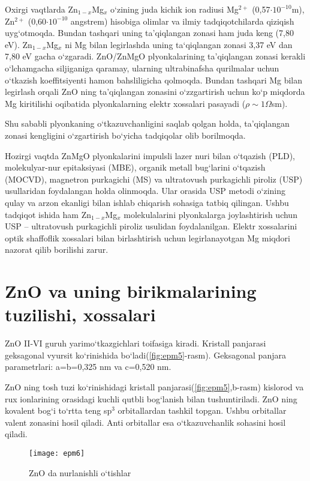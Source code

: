 \documentclass[14pt]{scrarticle}
\begin{document}
	Oxirgi vaqtlarda  Zn$_{1-x}$Mg$_{x}$ o`zining juda kichik ion radiusi Mg$^{2+}$ (0,57$\cdot 10^{-10}$m), Zn$^{2+}$ (0,60$\cdot 10^{-10}$ angstrem) hisobiga olimlar va ilmiy tadqiqotchilarda qiziqish uyg`otmoqda. Bundan tashqari uning ta'qiqlangan zonasi ham juda keng (7,80 eV). Zn$_{1-x}$Mg$_{x}$ ni  Mg bilan legirlashda uning ta`qiqlangan zonasi 3,37 eV dan 7,80 eV gacha o`zgaradi. ZnO/ZnMgO plyonkalarining ta'qiqlangan zonasi kerakli o`lchamgacha siljiganiga qaramay, ularning ultrabinafsha qurilmalar uchun o`tkazish koeffitsiyenti hamon bahsliligicha qolmoqda. Bundan tashqari Mg bilan legirlash orqali ZnO ning ta'qiqlangan zonasini o`zzgartirish uchun ko`p miqdorda Mg kiritilishi oqibatida plyonkalarning elektr xossalari pasayadi ($\rho\sim 1 \Omega$sm). 
	
	Shu sababli plyonkaning o`tkazuvchanligini saqlab qolgan holda, ta'qiqlangan zonasi kengligini o`zgartirish bo`yicha tadqiqolar olib borilmoqda. 
	
	Hozirgi vaqtda ZnMgO plyonkalarini impulsli lazer nuri bilan o`tqazish (PLD), molekulyar-nur epitaksiyasi (MBE), organik metall bug`larini o`tqazish (MOCVD), magnetron purkagichi (MS) va ultratovush purkagichli piroliz (USP) usullaridan foydalangan holda olinmoqda. Ular orasida USP metodi o`zining qulay va arzon ekanligi bilan ishlab chiqarish sohasiga tatbiq qilingan. 
	Ushbu tadqiqot ishida ham Zn$_{1-x}$Mg$_{x}$ molekulalarini plyonkalarga joylashtirish uchun USP -- ultratovush purkagichli piroliz usulidan foydalanilgan. Elektr xossalarini optik shaffoflik xossalari bilan birlashtirish uchun legirlanayotgan Mg miqdori nazorat qilib borilishi zarur. 
	
	 
	\section{ZnO va uning birikmalarining tuzilishi, xossalari}
	ZnO II-VI guruh yarimo`tkazgichlari toifasiga kiradi. Kristall panjarasi geksagonal vyursit ko`rinishida bo`ladi(\ref{fig:epm5}-rasm). Geksagonal panjara parametrlari: a=b=0,325 nm va c=0,520 nm. 
	
	ZnO ning tosh tuzi ko`rinishidagi kristall panjarasi(\ref{fig:epm5},b-rasm) kislorod va rux ionlarining orasidagi kuchli qutbli bog`lanish bilan tushuntiriladi. ZnO ning kovalent bog`i to`rtta teng sp$^{3}$ orbitallardan tashkil topgan. Ushbu orbitallar valent zonasini hosil qiladi. Anti orbitallar esa o`tkazuvchanlik sohasini hosil qiladi. 
	
	
\begin{figure*}[h]
	\centering
	\texttt{[image: epm6]}
	\caption{ZnO da nurlanishli o`tishlar}
	\label{fig:epm6}
\end{figure*}
	
\end{document}
